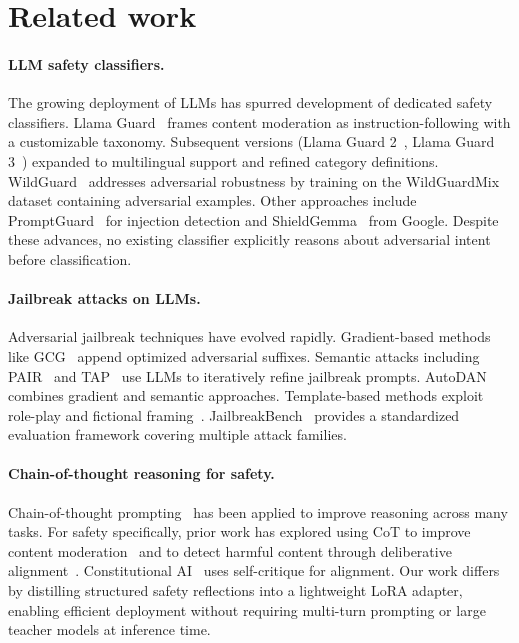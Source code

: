 \documentclass[11pt]{article}
\begin{document}
\section{Related work}

\paragraph{LLM safety classifiers.}
The growing deployment of LLMs has spurred development of dedicated safety classifiers. Llama Guard~\citep{inan2023llamaguard} frames content moderation as instruction-following with a customizable taxonomy. Subsequent versions (Llama Guard 2~\citep{metallamaguard2}, Llama Guard 3~\citep{metallamaguard3}) expanded to multilingual support and refined category definitions. WildGuard~\citep{han2024wildguard} addresses adversarial robustness by training on the WildGuardMix dataset containing adversarial examples. Other approaches include PromptGuard~\citep{meta2024promptguard} for injection detection and ShieldGemma~\citep{zeng2024shieldgemma} from Google. Despite these advances, no existing classifier explicitly reasons about adversarial intent before classification.

\paragraph{Jailbreak attacks on LLMs.}
Adversarial jailbreak techniques have evolved rapidly. Gradient-based methods like GCG~\citep{zou2023universal} append optimized adversarial suffixes. Semantic attacks including PAIR~\citep{chao2023jailbreaking} and TAP~\citep{mehrotra2024tree} use LLMs to iteratively refine jailbreak prompts. AutoDAN~\citep{liu2024autodan} combines gradient and semantic approaches. Template-based methods exploit role-play and fictional framing~\citep{wei2024jailbroken, shen2024anything}. JailbreakBench~\citep{chao2024jailbreakbench} provides a standardized evaluation framework covering multiple attack families.

\paragraph{Chain-of-thought reasoning for safety.}
Chain-of-thought prompting~\citep{wei2022chain} has been applied to improve reasoning across many tasks. For safety specifically, prior work has explored using CoT to improve content moderation~\citep{wang2024chain} and to detect harmful content through deliberative alignment~\citep{bai2024deliberative}. Constitutional AI~\citep{bai2022constitutional} uses self-critique for alignment. Our work differs by distilling structured safety reflections into a lightweight LoRA adapter, enabling efficient deployment without requiring multi-turn prompting or large teacher models at inference time.
\end{document}
